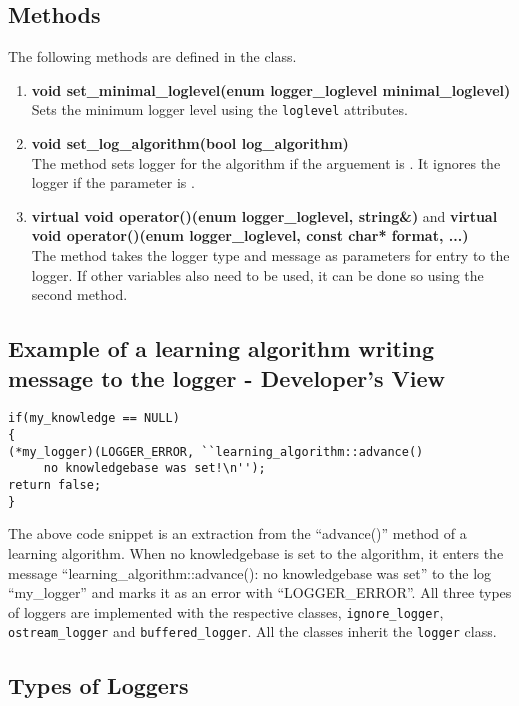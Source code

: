 \subsection*{Methods}
The following methods are defined in the class.
\begin{enumerate}
 \item \textbf{void set\_minimal\_loglevel(enum logger\_loglevel minimal\_loglevel)} \\
	Sets the minimum logger level using the \texttt{loglevel} attributes.
 \item \textbf{void set\_log\_algorithm(bool log\_algorithm)} \\
	The method sets logger for the algorithm if the arguement is \true. It ignores the logger if the parameter is \false. 
 \item \textbf{virtual void operator()(enum logger\_loglevel, string\&)} and \textbf{virtual void operator()(enum logger\_loglevel, 	const char* format, ...)} \\
	The method takes the logger type and message as parameters for entry to the logger. If other variables also need to be used, it can be done so using the second method. 
\end{enumerate}

\subsection*{Example of a learning algorithm writing message to the logger - Developer's View}
\begin{lstlisting}
if(my_knowledge == NULL) 
{
(*my_logger)(LOGGER_ERROR, ``learning_algorithm::advance() 
     no knowledgebase was set!\n'');
return false; 
}
\end{lstlisting}
The above code snippet is an extraction from the ``advance()'' method of a learning algorithm. When no knowledgebase is set to the algorithm, it enters the message ``learning\_algorithm::advance(): no knowledgebase was set'' to the log ``my\_logger'' and marks it as an error with ``LOGGER\_ERROR''. 
\vskip 1pt
All three types of loggers are implemented with the respective classes, \texttt{ignore\_logger}, \texttt{ostream\_logger} and \texttt{buffered\_logger}. All the classes inherit the \texttt{logger} class. \\

\subsection{Types of Loggers}
\label{sec:types}

